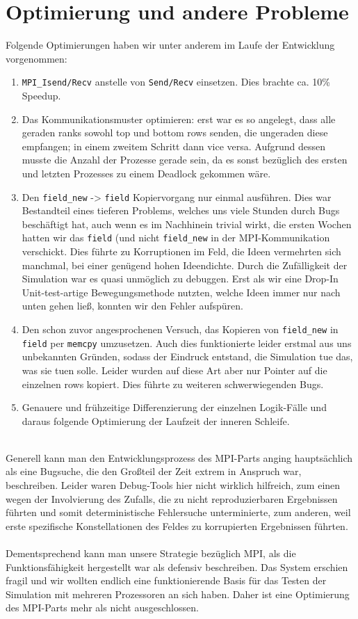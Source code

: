 \section{Optimierung und andere Probleme}
Folgende Optimierungen haben wir unter anderem im Laufe der Entwicklung vorgenommen:
\begin{enumerate}
	\item \texttt{MPI\_Isend/Recv} anstelle von \texttt{Send/Recv} einsetzen.
Dies brachte ca. 10\% Speedup.
  \item Das Kommunikationsmuster optimieren: erst war es so angelegt, dass alle geraden ranks sowohl top und bottom rows senden, die ungeraden diese empfangen; in einem zweitem Schritt dann vice versa. Aufgrund dessen musste die Anzahl der Prozesse gerade sein, da es sonst bezüglich des ersten und letzten Prozesses zu einem Deadlock gekommen wäre.
	\item Den \texttt{field\_new} -\textgreater{} \texttt{field} Kopiervorgang nur einmal ausführen.
Dies war Bestandteil eines tieferen Problems, welches uns viele Stunden durch Bugs beschäftigt hat, auch wenn es im Nachhinein trivial wirkt, die ersten Wochen hatten wir das \texttt{field} (und nicht \texttt{field\_new} in der MPI-Kommunikation verschickt.
Dies führte zu Korruptionen im Feld, die Ideen vermehrten sich manchmal, bei einer genügend hohen Ideendichte.
Durch die Zufälligkeit der Simulation war es quasi unmöglich zu debuggen.
Erst als wir eine Drop-In Unit-test-artige Bewegungsmethode nutzten, welche Ideen immer nur nach unten gehen ließ, konnten wir den Fehler aufspüren.
	\item Den schon zuvor angesprochenen Versuch, das Kopieren von \texttt{field\_new} in \texttt{field} per \texttt{memcpy} umzusetzen.
Auch dies funktionierte leider erstmal aus uns unbekannten Gründen, sodass der Eindruck entstand, die Simulation tue das, was sie tuen solle.
Leider wurden auf diese Art aber nur Pointer auf die einzelnen rows kopiert. Dies führte zu weiteren schwerwiegenden Bugs.
	\item Genauere und frühzeitige Differenzierung der einzelnen Logik-Fälle und daraus folgende Optimierung der Laufzeit der inneren Schleife.
\end{enumerate}
\quad \\
Generell kann man den Entwicklungsprozess des MPI-Parts anging hauptsächlich als eine Bugsuche, die den Großteil der Zeit extrem in Anspruch war, beschreiben.
Leider waren Debug-Tools hier nicht wirklich hilfreich, zum einen wegen der Involvierung des Zufalls, die zu nicht reproduzierbaren Ergebnissen führten und somit deterministische Fehlersuche unterminierte, zum anderen, weil erste spezifische Konstellationen des Feldes zu korrupierten Ergebnissen führten. \\
\quad \\
Dementsprechend kann man unsere Strategie bezüglich MPI, als die Funktionsfähigkeit hergestellt war als defensiv beschreiben.
Das System erschien fragil und wir wollten endlich eine funktionierende Basis für das Testen der Simulation mit mehreren Prozessoren an sich haben.
Daher ist eine Optimierung des MPI-Parts mehr als nicht ausgeschlossen.
